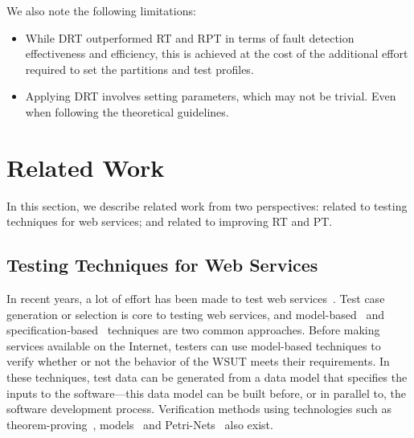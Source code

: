 \documentclass[10pt,journal,compsoc]{IEEEtran}
\begin{document}
We also note the following limitations:

\begin{itemize}
  \item
  While DRT outperformed RT and RPT in terms of fault detection effectiveness and efficiency, this is achieved at the cost of the additional effort required to set the partitions and test profiles.

  \item
  Applying DRT involves setting parameters, which may not be trivial. Even when following the theoretical guidelines.
\end{itemize}


\section{Related Work}
\label{sec:relatedwork}

In this section, we describe related work from two perspectives:
related to testing techniques for web services; and
related to improving RT and PT.

\subsection{Testing Techniques for Web Services}
\label{sec:relatedworkWS}

In recent years, a lot of effort has been made to test web services~\cite{canfora, bozkurt2010, li2014two, qiu2015regression}.
Test case generation or selection is core to testing web services, and model-based~\cite{dalal1999model} and specification-based~\cite{li2009towards} techniques are two common approaches.
Before making services available on the Internet, testers can use model-based techniques to verify whether or not the behavior of the WSUT meets their requirements.
In these techniques, test data can be generated from a data model that specifies the inputs to the software---this data model can be built before, or in parallel to, the software development process.
Verification methods using technologies such as theorem-proving~\cite{sinha2006model}, models~\cite{paradkar2007} and Petri-Nets~\cite{xiang2015executable} also exist.
\end{document}
